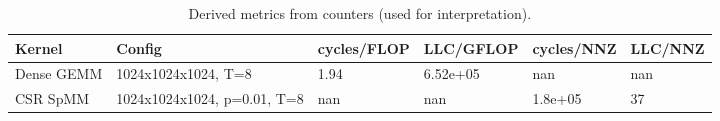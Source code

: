 \begin{table}[H]
\centering
\caption{Derived metrics from counters (used for interpretation).}
\label{tab:perf_derived}
\begin{tabular}{llllll}
\toprule
Kernel & Config & cycles/FLOP & LLC/GFLOP & cycles/NNZ & LLC/NNZ \\
\midrule
Dense GEMM & 1024x1024x1024, T=8 & 1.94 & 6.52e+05 & nan & nan \\
CSR SpMM & 1024x1024x1024, p=0.01, T=8 & nan & nan & 1.8e+05 & 37 \\
\bottomrule
\end{tabular}
\end{table}